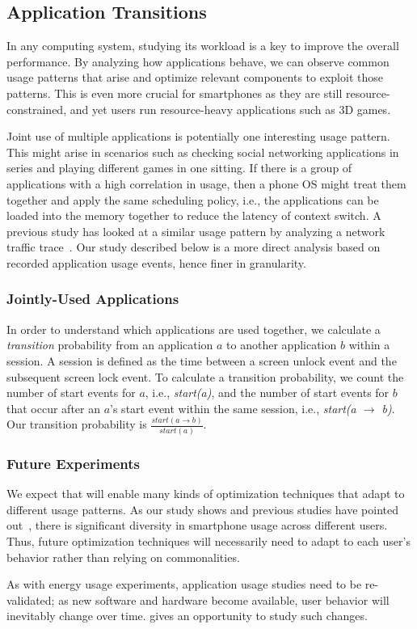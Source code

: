 \subsection{Application Transitions}
\label{subsec-apptransitions}



In any computing system, studying its workload is a key to improve the overall
performance. By analyzing how applications behave, we can observe common usage
patterns that arise and optimize relevant components to exploit those patterns.
This is even more crucial for smartphones as they are still
resource-constrained, and yet users run resource-heavy applications such as 3D
games.

Joint use of multiple applications is potentially one interesting usage pattern.
This might arise in scenarios such as checking social networking applications in
series and playing different games in one sitting. If there is a group of
applications with a high correlation in usage, then a phone OS might treat them
together and apply the same scheduling policy, i.e., the applications can be
loaded into the memory together to reduce the latency of context switch.
A previous study has looked at a similar usage pattern by analyzing a network
traffic trace~\cite{xu:imc:2011}. Our study described below is a more direct
analysis based on recorded application usage events, hence finer in granularity.

\subsubsection{Jointly-Used Applications}
In order to understand which applications are used together, we calculate a {\it
transition} probability from an application $a$ to another application $b$
within a session. A session is defined as the time between a screen unlock event
and the subsequent screen lock event. To calculate a transition probability, we
count the number of start events for $a$, i.e., {\it start(a)}, and the number
of start events for $b$ that occur after an $a$'s start event within the same
session, i.e., {\it start(a $\rightarrow$ b)}. Our transition probability is
$\frac{start(a \rightarrow b)}{start(a)}$.

\subsubsection{Future Experiments}

We expect that \PhoneLab{} will enable many kinds of optimization techniques
that adapt to different usage patterns. As our study shows and previous studies
have pointed out~\cite{falaki:mobisys:2010, shye:micro:2009}, there is
significant diversity in smartphone usage across different users. Thus, future
optimization techniques will necessarily need to adapt to each user's behavior
rather than relying on commonalities.

As with energy usage experiments, application usage studies need to be
re-validated; as new software and hardware become available, user behavior will
inevitably change over time. \PhoneLab{} gives an opportunity to study such
changes.
